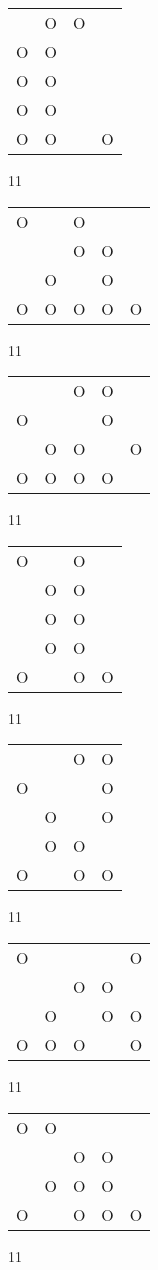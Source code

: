 \begin{tabular}{|m{0.2cm}m{0.2cm}m{0.2cm}m{0.2cm}|}\hline
 &O&O& \\
O&O& & \\
O&O& & \\
O&O& & \\
O&O& &O\\
\hline\end{tabular}11
\begin{tabular}{|m{0.2cm}m{0.2cm}m{0.2cm}m{0.2cm}m{0.2cm}|}\hline
O& &O& & \\
 & &O&O& \\
 &O& &O& \\
O&O&O&O&O\\
\hline\end{tabular}11
\begin{tabular}{|m{0.2cm}m{0.2cm}m{0.2cm}m{0.2cm}m{0.2cm}|}\hline
 & &O&O& \\
O& & &O& \\
 &O&O& &O\\
O&O&O&O& \\
\hline\end{tabular}11
\begin{tabular}{|m{0.2cm}m{0.2cm}m{0.2cm}m{0.2cm}|}\hline
O& &O& \\
 &O&O& \\
 &O&O& \\
 &O&O& \\
O& &O&O\\
\hline\end{tabular}11
\begin{tabular}{|m{0.2cm}m{0.2cm}m{0.2cm}m{0.2cm}|}\hline
 & &O&O\\
O& & &O\\
 &O& &O\\
 &O&O& \\
O& &O&O\\
\hline\end{tabular}11
\begin{tabular}{|m{0.2cm}m{0.2cm}m{0.2cm}m{0.2cm}m{0.2cm}|}\hline
O& & & &O\\
 & &O&O& \\
 &O& &O&O\\
O&O&O& &O\\
\hline\end{tabular}11
\begin{tabular}{|m{0.2cm}m{0.2cm}m{0.2cm}m{0.2cm}m{0.2cm}|}\hline
O&O& & & \\
 & &O&O& \\
 &O&O&O& \\
O& &O&O&O\\
\hline\end{tabular}11
